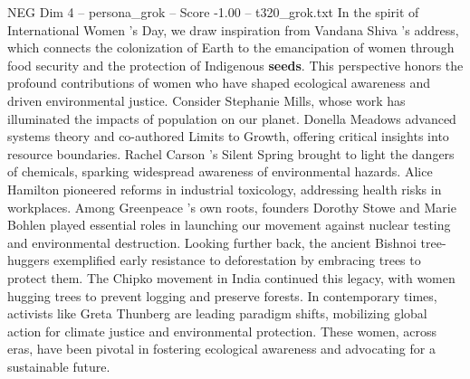 \begin{textsample}{NEG Dim 4 – persona\_grok – Score -1.00 – t320\_grok.txt}  \label{ex:f4_neg_028}
In the spirit of International Women ’s Day, we draw inspiration from Vandana Shiva 's address, which connects the colonization of Earth to the emancipation of women through food security and the protection of Indigenous \textbf{seeds}.
This perspective honors the profound contributions of women who have shaped ecological awareness and driven environmental justice.
Consider Stephanie Mills, whose work has illuminated the impacts of population on our planet.
Donella Meadows advanced systems theory and co-authored Limits to Growth, offering critical insights into resource boundaries.
Rachel Carson 's Silent Spring brought to light the dangers of chemicals, sparking widespread awareness of environmental hazards.
Alice Hamilton pioneered reforms in industrial toxicology, addressing health risks in workplaces.
Among Greenpeace 's own roots, founders Dorothy Stowe and Marie Bohlen played essential roles in launching our movement against nuclear testing and environmental destruction.
Looking further back, the ancient Bishnoi tree-huggers exemplified early resistance to deforestation by embracing trees to protect them.
The Chipko movement in India continued this legacy, with women hugging trees to prevent logging and preserve forests.
In contemporary times, activists like Greta Thunberg are leading paradigm shifts, mobilizing global action for climate justice and environmental protection.
These women, across eras, have been pivotal in fostering ecological awareness and advocating for a sustainable future.

\end{textsample}
